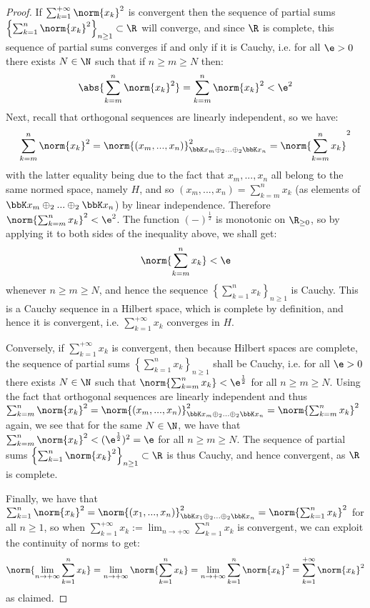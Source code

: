             \begin{proof}
                If $\sum_{k = 1}^{+\infty} \norm{x_k}^2$ is convergent then the sequence of partial sums $\left\{ \sum_{k = 1}^n \norm{x_k}^2 \right\}_{n \geq 1} \subset \R$ will converge, and since $\R$ is complete, this sequence of partial sums converges if and only if it is Cauchy, i.e. for all $\e > 0$ there exists $N \in \N$ such that if $n \geq m \geq N$ then:
                    $$\abs{ \sum_{k = m}^n \norm{x_k}^2 } = \sum_{k = m}^n \norm{x_k}^2 < \e^2$$
                Next, recall that orthogonal sequences are linearly independent, so we have:
                    $$\sum_{k = m}^n \norm{x_k}^2 = \norm{ ( x_m, ..., x_n ) }_{\bbK x_m \oplus_2 ... \oplus_2 \bbK x_n}^2 = \norm{\sum_{k = m}^n x_k}^2$$
                with the latter equality being due to the fact that $x_m, ..., x_n$ all belong to the same normed space, namely $H$, and so $( x_m, ..., x_n ) = \sum_{k = m}^n x_k$ (as elements of $\bbK x_m \oplus_2 ... \oplus_2 \bbK x_n$) by linear independence. Therefore $\norm{\sum_{k = m}^n x_k}^2 < \e^2$. The function $(-)^{\frac12}$ is monotonic on $\R_{\geq 0}$, so by applying it to both sides of the inequality above, we shall get:
                    $$\norm{\sum_{k = m}^n x_k} < \e$$
                whenever $n \geq m \geq N$, and hence the sequence $\left\{ \sum_{k = 1}^n x_k \right\}_{n \geq 1}$ is Cauchy. This is a Cauchy sequence in a Hilbert space, which is complete by definition, and hence it is convergent, i.e. $\sum_{k = 1}^{+\infty} x_k$ converges in $H$.

                Conversely, if $\sum_{k = 1}^{+\infty} x_k$ is convergent, then because Hilbert spaces are complete, the sequence of partial sums $\left\{ \sum_{k = 1}^n x_k \right\}_{n \geq 1}$ shall be Cauchy, i.e. for all $\e > 0$ there exists $N \in \N$ such that $\norm{ \sum_{k = m}^n x_k } < \e^{\frac12}$ for all $n \geq m \geq N$. Using the fact that orthogonal sequences are linearly independent and thus $\sum_{k = m}^n \norm{x_k}^2 = \norm{ ( x_m, ..., x_n ) }_{\bbK x_m \oplus_2 ... \oplus_2 \bbK x_n}^2 = \norm{\sum_{k = m}^n x_k}^2$ again, we see that for the same $N \in \N$, we have that $\sum_{k = m}^n \norm{x_k}^2 < (\e^{\frac12})^2 = \e$ for all $n \geq m \geq N$. The sequence of partial sums $\left\{ \sum_{k = 1}^n \norm{x_k}^2 \right\}_{n \geq 1} \subset \R$ is thus Cauchy, and hence convergent, as $\R$ is complete.

                Finally, we have that $\sum_{k = 1}^n \norm{x_k}^2 = \norm{ ( x_1, ..., x_n ) }_{\bbK x_1 \oplus_2 ... \oplus_2 \bbK x_n}^2 = \norm{\sum_{k = 1}^n x_k}^2$ for all $n \geq 1$, so when $\sum_{k = 1}^{+\infty} x_k := \lim_{n \to +\infty} \sum_{k = 1}^n x_k$ is convergent, we can exploit the continuity of norms to get:
                    $$\norm{\lim_{n \to +\infty} \sum_{k = 1}^n x_k} = \lim_{n \to +\infty} \norm{\sum_{k = 1}^n x_k} = \lim_{n \to +\infty} \sum_{k = 1}^n \norm{x_k}^2 = \sum_{k = 1}^{+\infty} \norm{x_k}^2$$
                as claimed.
            \end{proof}

